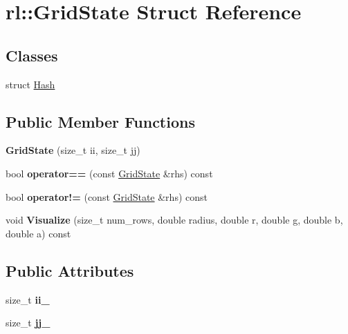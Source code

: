 \hypertarget{structrl_1_1_grid_state}{}\section{rl\+:\+:Grid\+State Struct Reference}
\label{structrl_1_1_grid_state}
\subsection*{Classes}
\begin{DoxyCompactItemize}
\item 
struct \hyperlink{structrl_1_1_grid_state_1_1_hash}{Hash}
\end{DoxyCompactItemize}
\subsection*{Public Member Functions}
\begin{DoxyCompactItemize}
\item 
\hypertarget{structrl_1_1_grid_state_a7aee8d309c9081f8b9f28d09eed9cc8d}{}\label{structrl_1_1_grid_state_a7aee8d309c9081f8b9f28d09eed9cc8d} 
{\bfseries Grid\+State} (size\+\_\+t ii, size\+\_\+t jj)
\item 
\hypertarget{structrl_1_1_grid_state_a51463b19682deac1da7d9b20549145df}{}\label{structrl_1_1_grid_state_a51463b19682deac1da7d9b20549145df} 
bool {\bfseries operator==} (const \hyperlink{structrl_1_1_grid_state}{Grid\+State} \&rhs) const
\item 
\hypertarget{structrl_1_1_grid_state_ab32fce6e0df7d27bb17483e141b54ada}{}\label{structrl_1_1_grid_state_ab32fce6e0df7d27bb17483e141b54ada} 
bool {\bfseries operator!=} (const \hyperlink{structrl_1_1_grid_state}{Grid\+State} \&rhs) const
\item 
\hypertarget{structrl_1_1_grid_state_a041da121d62a5153f2278ef38b98f55c}{}\label{structrl_1_1_grid_state_a041da121d62a5153f2278ef38b98f55c} 
void {\bfseries Visualize} (size\+\_\+t num\+\_\+rows, double radius, double r, double g, double b, double a) const
\end{DoxyCompactItemize}
\subsection*{Public Attributes}
\begin{DoxyCompactItemize}
\item 
\hypertarget{structrl_1_1_grid_state_a91bf4c50c85c2980c6213c72ec468691}{}\label{structrl_1_1_grid_state_a91bf4c50c85c2980c6213c72ec468691} 
size\+\_\+t {\bfseries ii\+\_\+}
\item 
\hypertarget{structrl_1_1_grid_state_aa53f8a955bb8507589d0c023c5e3f958}{}\label{structrl_1_1_grid_state_aa53f8a955bb8507589d0c023c5e3f958} 
size\+\_\+t {\bfseries jj\+\_\+}
\end{DoxyCompactItemize}


